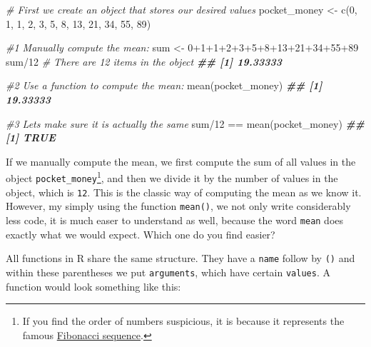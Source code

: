 \documentclass[
]{book}
\newenvironment{Shaded}{\begin{snugshade}}{\end{snugshade}}
\newcommand{\CommentTok}[1]{\textcolor[rgb]{0.56,0.35,0.01}{\textit{#1}}}
\newcommand{\DecValTok}[1]{\textcolor[rgb]{0.00,0.00,0.81}{#1}}
\newcommand{\DocumentationTok}[1]{\textcolor[rgb]{0.56,0.35,0.01}{\textbf{\textit{#1}}}}
\newcommand{\FunctionTok}[1]{\textcolor[rgb]{0.00,0.00,0.00}{#1}}
\newcommand{\NormalTok}[1]{#1}
\newcommand{\OtherTok}[1]{\textcolor[rgb]{0.56,0.35,0.01}{#1}}
\newcommand{\SpecialCharTok}[1]{\textcolor[rgb]{0.00,0.00,0.00}{#1}}
\begin{document}
\begin{Shaded}
\begin{Highlighting}[]
\CommentTok{\# First we create an object that stores our desired values}
\NormalTok{pocket\_money }\OtherTok{\textless{}{-}} \FunctionTok{c}\NormalTok{(}\DecValTok{0}\NormalTok{, }\DecValTok{1}\NormalTok{, }\DecValTok{1}\NormalTok{, }\DecValTok{2}\NormalTok{, }\DecValTok{3}\NormalTok{, }\DecValTok{5}\NormalTok{, }\DecValTok{8}\NormalTok{, }\DecValTok{13}\NormalTok{, }\DecValTok{21}\NormalTok{, }\DecValTok{34}\NormalTok{, }\DecValTok{55}\NormalTok{, }\DecValTok{89}\NormalTok{)}

\CommentTok{\#1 Manually compute the mean:}
\NormalTok{sum }\OtherTok{\textless{}{-}} \DecValTok{0}\SpecialCharTok{+}\DecValTok{1}\SpecialCharTok{+}\DecValTok{1}\SpecialCharTok{+}\DecValTok{2}\SpecialCharTok{+}\DecValTok{3}\SpecialCharTok{+}\DecValTok{5}\SpecialCharTok{+}\DecValTok{8}\SpecialCharTok{+}\DecValTok{13}\SpecialCharTok{+}\DecValTok{21}\SpecialCharTok{+}\DecValTok{34}\SpecialCharTok{+}\DecValTok{55}\SpecialCharTok{+}\DecValTok{89}
\NormalTok{sum}\SpecialCharTok{/}\DecValTok{12} \CommentTok{\# There are 12 items in the object}
\DocumentationTok{\#\# [1] 19.33333}

\CommentTok{\#2 Use a function to compute the mean:}
\FunctionTok{mean}\NormalTok{(pocket\_money)}
\DocumentationTok{\#\# [1] 19.33333}

\CommentTok{\#3 Let\textquotesingle{}s make sure it is actually the same}
\NormalTok{sum}\SpecialCharTok{/}\DecValTok{12} \SpecialCharTok{==} \FunctionTok{mean}\NormalTok{(pocket\_money)}
\DocumentationTok{\#\# [1] TRUE}
\end{Highlighting}
\end{Shaded}

If we manually compute the mean, we first compute the sum of all values in the object \texttt{pocket\_money}\footnote{If you find the order of numbers suspicious, it is because it represents the famous \href{https://en.wikipedia.org/wiki/Fibonacci_number}{Fibonacci sequence}.}, and then we divide it by the number of values in the object, which is \texttt{12}. This is the classic way of computing the mean as we know it. However, my simply using the function \texttt{mean()}, we not only write considerably less code, it is much easer to understand as well, because the word \texttt{mean} does exactly what we would expect. Which one do you find easier?

All functions in R share the same structure. They have a \texttt{name} follow by \texttt{()} and within these parentheses we put \texttt{arguments}, which have certain \texttt{values}. A function would look something like this:
\end{document}
